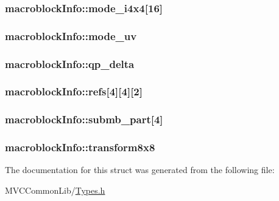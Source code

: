 \hypertarget{structmacroblock_info_a088e83914a079456b10a7f6db04dfc46}{
\subsubsection[{mode\_\-i4x4}]{ {\bf macroblockInfo::mode\_\-i4x4}\mbox{[}16\mbox{]}}}
\label{structmacroblock_info_a088e83914a079456b10a7f6db04dfc46}
\hypertarget{structmacroblock_info_a562426f4ab2f9cd93c95cff91faaa0f6}{
\subsubsection[{mode\_\-uv}]{ {\bf macroblockInfo::mode\_\-uv}}}
\label{structmacroblock_info_a562426f4ab2f9cd93c95cff91faaa0f6}
\hypertarget{structmacroblock_info_a732ef45ea0429985a3833fc7a93bf9fd}{
\subsubsection[{qp\_\-delta}]{ {\bf macroblockInfo::qp\_\-delta}}}
\label{structmacroblock_info_a732ef45ea0429985a3833fc7a93bf9fd}
\hypertarget{structmacroblock_info_a8501600ad3ab8d7865c28c8398e900f9}{
\subsubsection[{refs}]{ {\bf macroblockInfo::refs}\mbox{[}4\mbox{]}\mbox{[}4\mbox{]}\mbox{[}2\mbox{]}}}
\label{structmacroblock_info_a8501600ad3ab8d7865c28c8398e900f9}
\hypertarget{structmacroblock_info_a55e45fad5c7713d3c68b86f07921d2dc}{
\subsubsection[{submb\_\-part}]{ {\bf macroblockInfo::submb\_\-part}\mbox{[}4\mbox{]}}}
\label{structmacroblock_info_a55e45fad5c7713d3c68b86f07921d2dc}
\hypertarget{structmacroblock_info_a0f244dcaf8b80e1f8adc3973e34e0a25}{
\subsubsection[{transform8x8}]{ {\bf macroblockInfo::transform8x8}}}
\label{structmacroblock_info_a0f244dcaf8b80e1f8adc3973e34e0a25}


The documentation for this struct was generated from the following file:\begin{DoxyCompactItemize}
\item 
MVCCommonLib/\hyperlink{_types_8h}{Types.h}\end{DoxyCompactItemize}
